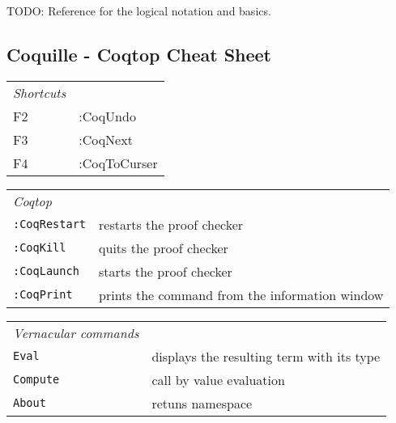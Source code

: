 TODO: Reference for the logical notation and basics.

\subsection{Coquille - Coqtop Cheat Sheet}

\begin{table}[h]
		\begin{left}
			\begin{tabular}{l|l}
			  \emph{Shortcuts}\\ 		
		      F2      & :CoqUndo \\ 	     	                                                   
		      F3      & :CoqNext \\         
		      F4      & :CoqToCurser  
		    \end{tabular}
		\end{left}
		\label{tab:coquilleCheatSheetKeys}
	\end{table}		    
\begin{table}[h]
		\begin{left}		    	
		    \begin{tabular}{l|l}
		    \emph{Coqtop}\\
		    \lstinline!:CoqRestart! &   restarts the proof checker \\       
		    \lstinline!:CoqKill!    &   quits the proof checker \\        
		    \lstinline!:CoqLaunch!  &   starts the proof checker\\   
		    \lstinline!:CoqPrint!  &   prints the command from the information window \\
		    \end{tabular}
		    \label{tab:coquilleCheatSheetCoqTop}
		\end{left} 
	\end{table}			    
\begin{table}[h]
		\begin{left}		    
     	     \begin{tabular}{l|l}
     	     \emph{Vernacular commands}\\
		          \lstinline!Eval!       & displays the resulting term with its type  \\  
		          \lstinline!Compute!    & call by value evaluation \\          	          
		          \lstinline!About!      & retuns namespace
	   		\end{tabular}
	   			\label{tab:coquilleCheatSheetVernacular}
		\end{left} 
	\end{table}		  
	
